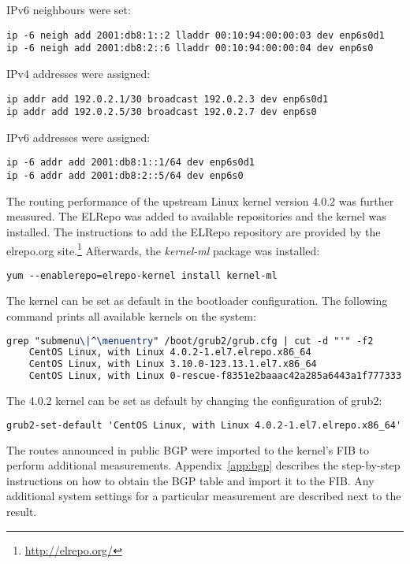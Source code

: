 IPv6 neighbours were set:
\begin{lstlisting}
ip -6 neigh add 2001:db8:1::2 lladdr 00:10:94:00:00:03 dev enp6s0d1
ip -6 neigh add 2001:db8:2::6 lladdr 00:10:94:00:00:04 dev enp6s0
\end{lstlisting}
IPv4 addresses were assigned:
\begin{lstlisting}
ip addr add 192.0.2.1/30 broadcast 192.0.2.3 dev enp6s0d1
ip addr add 192.0.2.5/30 broadcast 192.0.2.7 dev enp6s0
\end{lstlisting}
IPv6 addresses were assigned:
\begin{lstlisting}
ip -6 addr add 2001:db8:1::1/64 dev enp6s0d1
ip -6 addr add 2001:db8:2::5/64 dev enp6s0
\end{lstlisting}

The routing performance of the upstream Linux kernel version 4.0.2 was further measured.
The ELRepo was added to available repositories and the kernel was installed.
The instructions to add the ELRepo repository are provided by the elrepo.org site.\footnote{\url{http://elrepo.org/}}
Afterwards, the {\it{kernel-ml}} package was installed:
\begin{lstlisting}
yum --enablerepo=elrepo-kernel install kernel-ml
\end{lstlisting}
The kernel can be set as default in the bootloader configuration.
The following command prints all available kernels on the system:
\begin{lstlisting}[language=TeX]
grep "submenu\|^\menuentry" /boot/grub2/grub.cfg | cut -d "'" -f2
	CentOS Linux, with Linux 4.0.2-1.el7.elrepo.x86_64
	CentOS Linux, with Linux 3.10.0-123.13.1.el7.x86_64
	CentOS Linux, with Linux 0-rescue-f8351e2baaac42a285a6443a1f777333
\end{lstlisting}
The 4.0.2 kernel can be set as default by changing the configuration of grub2:
\begin{lstlisting}[language=TeX]
grub2-set-default 'CentOS Linux, with Linux 4.0.2-1.el7.elrepo.x86_64'
\end{lstlisting}

The routes announced in public BGP were imported to the kernel's FIB to perform additional measurements.
Appendix~\ref{app:bgp} describes the step-by-step instructions on how to obtain the BGP table and import it to the FIB.
Any additional system settings for a particular measurement are described next to the result.
